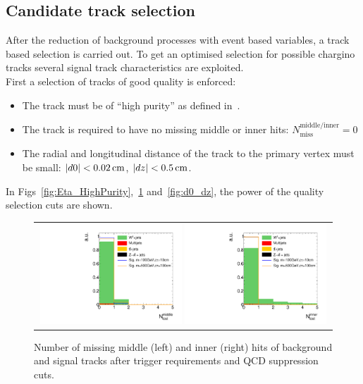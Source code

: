 \subsection{Candidate track selection}
\label{sec:CandidateTrackSelection}
After the reduction of background processes with event based variables, a track based selection is carried out.
To get an optimised selection for possible chargino tracks several signal track characteristics are exploited.\\

First a selection of tracks of good quality is enforced:
\begin{itemize}
\renewcommand{\labelitemi}{\footnotesize{\ding{118}}}
\item The track must be of ``high purity'' as defined in~\cite{bib:CMS:Tracking_2010}.
\item The track is required to have no missing middle or inner hits: $N_{\text{miss}}^{\text{middle/inner}}=0$
\item The radial and longitudinal  distance of the track to the primary vertex must be small: \mbox{$|d0|<0.02\,\text{cm}$}, \mbox{$|dz|<0.5\,\text{cm}$}.
\end{itemize}
In Figs~\ref{fig:Eta_HighPurity},~\ref{fig:LostHits} and~\ref{fig:d0_dz}, the power of the quality selection cuts are shown.\\
\begin{figure}[!t]
  \centering 
  \begin{tabular}{c}
    \includegraphics[width=0.49\textwidth]{figures/analysis/AnalysisSelection/chiTracksQCDsupressionTrigger_2Signals_FullBkg/htrackNLostMid_lin.pdf}
    \includegraphics[width=0.49\textwidth]{figures/analysis/AnalysisSelection/chiTracksQCDsupressionTrigger_2Signals_FullBkg/htrackNLostInner_lin.pdf}
  \end{tabular}
  \caption{Number of missing middle (left) and inner (right) hits of background and signal tracks after trigger requirements and QCD suppression cuts.}
  \label{fig:LostHits}
\end{figure}
